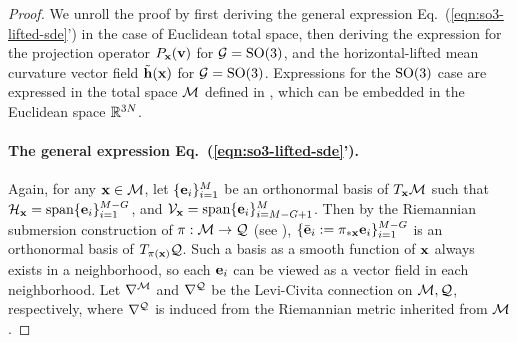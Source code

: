 \begin{proof}
    We unroll the proof by first deriving the general expression Eq.~(\ref{eqn:so3-lifted-sde}') in the case of Euclidean total space, then deriving the expression for the projection operator $P_{\mathbf{x}}(\mathbf{v})$ for $\mathcal{G} = \mathrm{SO}(3)$, and the horizontal-lifted mean curvature vector field $\tilde{\mathbf{h}}(\mathbf{x})$ for $\mathcal{G} = \mathrm{SO}(3)$. Expressions for the $\mathrm{SO}(3)$ case are expressed in the total space $\mathcal{M}$ defined in , which can be embedded in the Euclidean space $\mathbb{R}^{3N}$.

    \paragraph{The general expression Eq.~(\ref{eqn:so3-lifted-sde}').}
    Again, for any $\mathbf{x} \in \mathcal{M}$, let $\{\mathbf{e}_i\}_{i=1}^M$ be an orthonormal basis of $T_{\mathbf{x}} \mathcal{M}$ such that $\mathcal{H}_{\mathbf{x}} = \mathrm{span}\{\mathbf{e}_i\}_{i=1}^{M-G}$, and $\mathcal{V}_{\mathbf{x}} = \mathrm{span}\{\mathbf{e}_i\}_{i=M-G+1}^M$. Then by the Riemannian submersion construction of $\pi:\mathcal{M}\to\mathcal{Q}$ (see ), $\{\bar{\mathbf{e}}_i:=\pi_{*\mathbf{x}} \mathbf{e}_i\}_{i=1}^{M-G}$ is an orthonormal basis of $T_{\pi(\mathbf{x})} \mathcal{Q}$. Such a basis as a smooth function of $\mathbf{x}$ always exists in a neighborhood, so each $\mathbf{e}_i$ can be viewed as a vector field in each neighborhood.
    Let $\nabla^{\mathcal{M}}$ and $\nabla^{\mathcal{Q}}$ be the Levi-Civita connection on $\mathcal{M},\mathcal{Q}$, respectively, where $\nabla^{\mathcal{Q}}$ is induced from the Riemannian metric inherited from $\mathcal{M}$.    
    

\end{proof}

